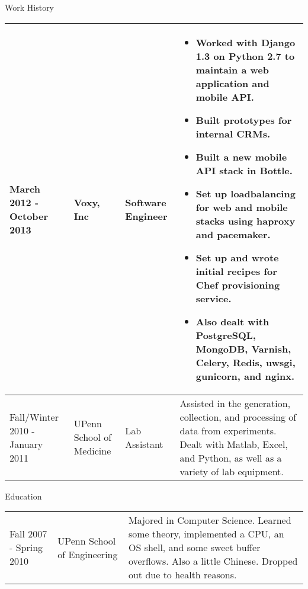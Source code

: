 \documentclass[a4paper]{article}
\begin{document}
    \vspace{.2in}
    \begin{large}
    Work History \\
    \end{large}
    \begin{tabular}{ m{3cm} m{3cm} m{3cm} m{8cm} }
        \hline
        March 2012 - \newline October 2013 & Voxy, Inc & Software Engineer & 
            \begin{itemize}
                \item Worked with Django 1.3 on Python 2.7 to maintain a web application and mobile API.
                \item Built prototypes for internal CRMs.
                \item Built a new mobile API stack in Bottle.
                \item Set up loadbalancing for web and mobile stacks using haproxy and pacemaker.
                \item Set up and wrote initial recipes for Chef provisioning service.
                \item Also dealt with PostgreSQL, MongoDB, Varnish, Celery, Redis, uwsgi, gunicorn, and nginx. 
            \end{itemize}
        \\
        \hline
        Fall/Winter 2010 - January 2011 & UPenn \newline School of Medicine & Lab Assistant & Assisted in the generation, collection, and processing of data from experiments. \newline Dealt with Matlab, Excel, and Python, as well as a variety of lab equipment. \\
        \hline
    \end{tabular}
    \vspace{.3in}

    \begin{large}
        Education \\
    \end{large}
    \begin{tabular}{ m{3cm} m{6.45cm} m{8cm} }
        \hline
        Fall 2007 - \newline Spring 2010 & UPenn \newline School of Engineering & Majored in Computer Science. Learned some theory, implemented a CPU, an OS shell, and some sweet buffer overflows. Also a little Chinese. Dropped out due to health reasons. \\
    \end{tabular}
    \vspace{.3in}
    
\end{document}

